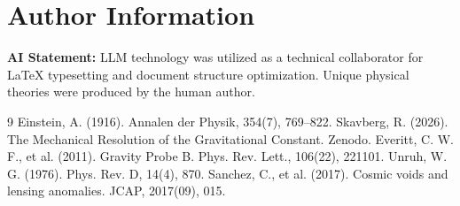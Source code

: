 \documentclass[12pt,a4paper]{article}
\begin{document}
\section*{Author Information}
\noindent \textbf{AI Statement:} LLM technology was utilized as a technical collaborator for LaTeX typesetting and document structure optimization. Unique physical theories were produced by the human author.

\begin{thebibliography}{9}
 Einstein, A. (1916). Annalen der Physik, 354(7), 769--822.
 Skavberg, R. (2026). The Mechanical Resolution of the Gravitational Constant. Zenodo.
 Everitt, C. W. F., et al. (2011). Gravity Probe B. Phys. Rev. Lett., 106(22), 221101.
 Unruh, W. G. (1976). Phys. Rev. D, 14(4), 870.
 Sanchez, C., et al. (2017). Cosmic voids and lensing anomalies. JCAP, 2017(09), 015.
\end{thebibliography}
\end{document}
